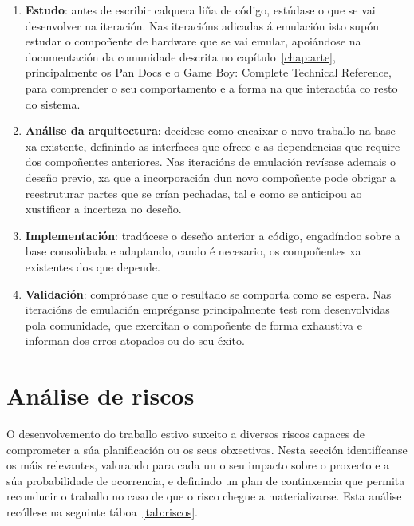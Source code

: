 \begin{enumerate}
  \item \textbf{Estudo}:
  antes de escribir calquera liña de código, estúdase o que se vai desenvolver na iteración.
  Nas iteracións adicadas á emulación isto supón estudar o compoñente de hardware que se vai emular,
  apoiándose na documentación da comunidade descrita no capítulo~\ref{chap:arte},
  principalmente os Pan Docs e o Game Boy: Complete Technical Reference,
  para comprender o seu comportamento e a forma na que interactúa co resto do sistema.

  \item \textbf{Análise da arquitectura}:
  decídese como encaixar o novo traballo na base xa existente,
  definindo as interfaces que ofrece e as dependencias que require dos compoñentes anteriores.
  Nas iteracións de emulación revísase ademais o deseño previo,
  xa que a incorporación dun novo compoñente pode obrigar a reestruturar partes que se crían pechadas,
  tal e como se anticipou ao xustificar a incerteza no deseño.

  \item \textbf{Implementación}:
  tradúcese o deseño anterior a código, engadíndoo sobre a base consolidada
  e adaptando, cando é necesario, os compoñentes xa existentes dos que depende.

  \item \textbf{Validación}:
  compróbase que o resultado se comporta como se espera.
  Nas iteracións de emulación empréganse principalmente test \acrshort{rom} desenvolvidas pola comunidade,
  que exercitan o compoñente de forma exhaustiva e informan dos erros atopados ou do seu éxito.
\end{enumerate}



\section{Análise de riscos}
\label{sec:riscos}
O desenvolvemento do traballo estivo suxeito a diversos
riscos capaces de comprometer a súa planificación ou os seus obxectivos.
Nesta sección identifícanse os máis relevantes, valorando para cada un o seu impacto
sobre o proxecto e a súa probabilidade de ocorrencia, e definindo un plan de continxencia
que permita reconducir o traballo no caso de que o risco chegue a materializarse.
Esta análise recóllese na seguinte táboa~\ref{tab:riscos}.

